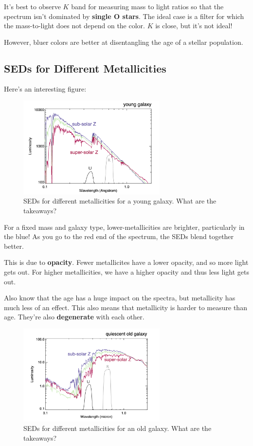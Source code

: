\documentclass{article}
\begin{document}
It's best to observe $K$ band for measuring mass to light ratios so that the spectrum isn't dominated by \textbf{single O stars}. The ideal case is a filter for which the mass-to-light does not depend on the color. $K$ is close, but it's not ideal! 

However, bluer colors are better at disentangling the age of a stellar population. 

\subsection{SEDs for Different Metallicities}

Here's an interesting figure:

\begin{figure}
    \centering
    \includegraphics[width=0.66\textwidth]{figs/Screen Shot 2021-09-02 at 9.41.22 AM.png}
    \caption{SEDs for different metallicities for a young galaxy. What are the takeaways? }
    \label{fig:sed_z}
\end{figure}

For a fixed mass and galaxy type, lower-metallicities are brighter, particularly in the blue! As you go to the red end of the spectrum, the SEDs blend together better. 

This is due to \textbf{opacity}. Fewer metallicites have a lower opacity, and so more light gets out. For higher metallicities, we have a higher opacity and thus less light gets out. 

Also know that the age has a huge impact on the spectra, but metallicity has much less of an effect. This also means that metallicity is harder to measure than age. They're also \textbf{degenerate} with each other. 

\begin{figure}
    \centering
    \includegraphics[width=0.66\textwidth]{figs/Screen Shot 2021-09-02 at 9.41.34 AM.png}
    \caption{SEDs for different metallicities for an old galaxy. What are the takeaways? }
    \label{fig:sed_z_old}
\end{figure}
\end{document}
